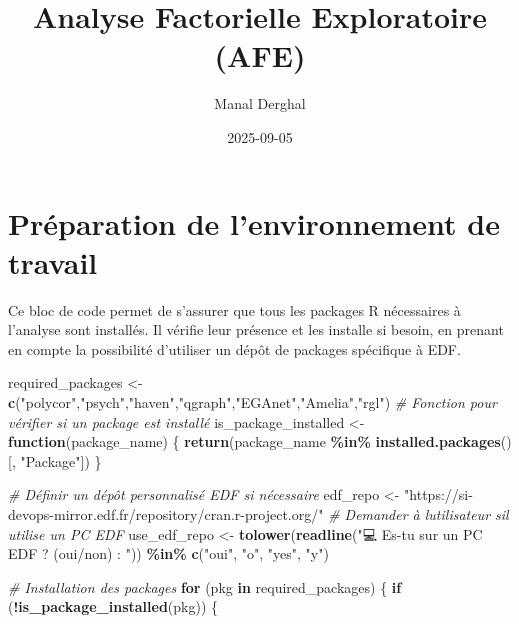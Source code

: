 \documentclass[
]{article}
\title{Analyse Factorielle Exploratoire (AFE)}
\author{Manal Derghal}
\date{2025-09-05}
\newenvironment{Shaded}{\begin{snugshade}}{\end{snugshade}}
\newcommand{\CommentTok}[1]{\textcolor[rgb]{0.56,0.35,0.01}{\textit{#1}}}
\newcommand{\ControlFlowTok}[1]{\textcolor[rgb]{0.13,0.29,0.53}{\textbf{#1}}}
\newcommand{\FunctionTok}[1]{\textcolor[rgb]{0.13,0.29,0.53}{\textbf{#1}}}
\newcommand{\NormalTok}[1]{#1}
\newcommand{\OtherTok}[1]{\textcolor[rgb]{0.56,0.35,0.01}{#1}}
\newcommand{\SpecialCharTok}[1]{\textcolor[rgb]{0.81,0.36,0.00}{\textbf{#1}}}
\newcommand{\StringTok}[1]{\textcolor[rgb]{0.31,0.60,0.02}{#1}}
\begin{document}
\maketitle

\section{Préparation de l'environnement de
travail}\label{pruxe9paration-de-lenvironnement-de-travail}

Ce bloc de code permet de s'assurer que tous les packages R nécessaires
à l'analyse sont installés. Il vérifie leur présence et les installe si
besoin, en prenant en compte la possibilité d'utiliser un dépôt de
packages spécifique à EDF.

\begin{Shaded}
\begin{Highlighting}[]
\NormalTok{required\_packages }\OtherTok{\textless{}{-}} \FunctionTok{c}\NormalTok{(}\StringTok{"polycor"}\NormalTok{,}\StringTok{"psych"}\NormalTok{,}\StringTok{"haven"}\NormalTok{,}\StringTok{"qgraph"}\NormalTok{,}\StringTok{"EGAnet"}\NormalTok{,}\StringTok{"Amelia"}\NormalTok{,}\StringTok{"rgl"}\NormalTok{)}
\CommentTok{\# Fonction pour vérifier si un package est installé}
\NormalTok{is\_package\_installed }\OtherTok{\textless{}{-}} \ControlFlowTok{function}\NormalTok{(package\_name) \{}
  \FunctionTok{return}\NormalTok{(package\_name }\SpecialCharTok{\%in\%} \FunctionTok{installed.packages}\NormalTok{()[, }\StringTok{"Package"}\NormalTok{])}
\NormalTok{\}}

\CommentTok{\# Définir un dépôt personnalisé EDF si nécessaire}
\NormalTok{edf\_repo }\OtherTok{\textless{}{-}} \StringTok{"https://si{-}devops{-}mirror.edf.fr/repository/cran.r{-}project.org/"}
\CommentTok{\# Demander à l\textquotesingle{}utilisateur s\textquotesingle{}il utilise un PC EDF}
\NormalTok{use\_edf\_repo }\OtherTok{\textless{}{-}} \FunctionTok{tolower}\NormalTok{(}\FunctionTok{readline}\NormalTok{(}\StringTok{"💻 Es{-}tu sur un PC EDF ? (oui/non) : "}\NormalTok{)) }\SpecialCharTok{\%in\%} \FunctionTok{c}\NormalTok{(}\StringTok{"oui"}\NormalTok{, }\StringTok{"o"}\NormalTok{, }\StringTok{"yes"}\NormalTok{, }\StringTok{"y"}\NormalTok{)}

\CommentTok{\# Installation des packages}
\ControlFlowTok{for}\NormalTok{ (pkg }\ControlFlowTok{in}\NormalTok{ required\_packages) \{}
  \ControlFlowTok{if}\NormalTok{ (}\SpecialCharTok{!}\FunctionTok{is\_package\_installed}\NormalTok{(pkg)) \{}
    


\end{Highlighting}
\end{Shaded}
\end{document}
